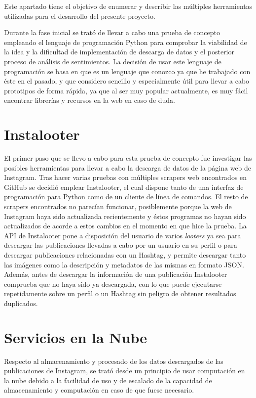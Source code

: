 
Este apartado tiene el objetivo de enumerar y describir las múltiples herramientas utilizadas para el desarrollo del presente proyecto.

Durante la fase inicial se trató de llevar a cabo una prueba de concepto empleando el lenguaje de programación Python para comprobar la viabilidad de la idea y la dificultad de implementación de descarga de datos y el posterior proceso de análisis de sentimientos. La decisión de usar este lenguaje de programación se basa en que es un lenguaje que conozco ya que he trabajado con éste en el pasado, y que considero sencillo y especialmente útil para llevar a cabo prototipos de forma rápida, ya que al ser muy popular actualmente, es muy fácil encontrar librerías y recursos en la web en caso de duda.

\section{Instalooter}

El primer paso que se llevo a cabo para esta prueba de concepto fue investigar las posibles herramientas para llevar a cabo la descarga de datos de la página web de Instagram. Tras hacer varias pruebas con múltiples scrapers web encontrados en GitHub se decidió emplear Instalooter, el cual dispone tanto de una interfaz de programación para Python como de un cliente de línea de comandos. El resto de scrapers encontrados no parecían funcionar, posiblemente porque la web de Instagram haya sido actualizada recientemente y éstos programas no hayan sido actualizados de acorde a estos cambios en el momento en que hice la prueba. La API de Instalooter pone a disposición del usuario de varios \textit{looters} ya sea para descargar las publicaciones llevadas a cabo por un usuario en su perfil o para descargar publicaciones relacionadas con un Hashtag, y permite descargar tanto las imágenes como la descripción y metadatos de las mismas en formato JSON. Además, antes de descargar la información de una publicación Instalooter comprueba que no haya sido ya descargada, con lo que puede ejecutarse repetidamente sobre un perfil o un Hashtag sin peligro de obtener resultados duplicados.

\section{Servicios en la Nube}

Respecto al almacenamiento y procesado de los datos descargados de las publicaciones de Instagram, se trató desde un principio de usar computación en la nube debido a la facilidad de uso y de escalado de la capacidad de almacenamiento y computación en caso de que fuese necesario.

